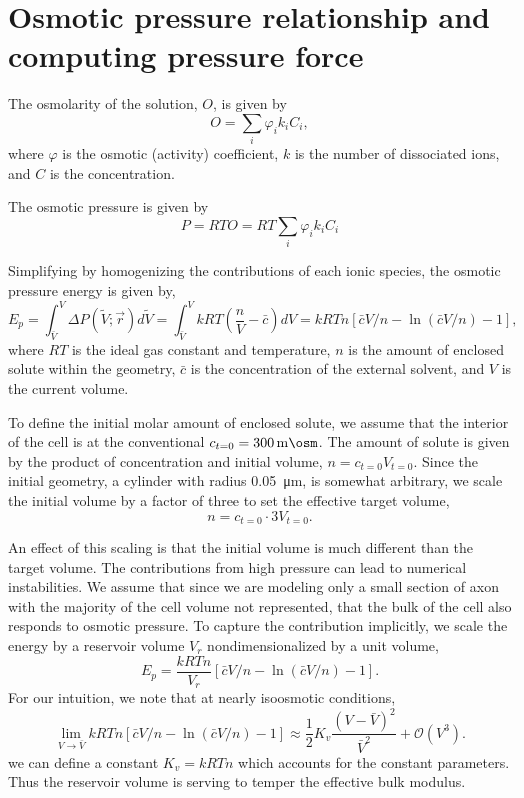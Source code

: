 \documentclass[11pt]{article}
\begin{document}
\section{Osmotic pressure relationship and computing pressure force}

The osmolarity of the solution, \(O\), is given by
\begin{equation}
    O = \sum_i \varphi_i k_i C_i,
\end{equation}
where \(\varphi\) is the osmotic (activity) coefficient, \(k\) is the number of dissociated ions, and \(C\) is the concentration.

The osmotic pressure is given by
\begin{equation}
    P = RTO  = RT \sum_i  \varphi_i k_i C_i
\end{equation}

Simplifying by homogenizing the contributions of each ionic species, the osmotic pressure energy is given by,
\begin{equation}
    E_p = \int_{\bar{V}}^{V} \Delta P(\tilde{V}; \vec{r})d \tilde{V} = \int_{\bar{V}}^{V} kRT \left(\frac{n}{V} - \bar{c}\right) dV = kRTn[\bar{c}V/n - \ln(\bar{c}V/n) -1],
\end{equation}
where \(RT\) is the ideal gas constant and temperature, \(n\) is the amount of enclosed solute within the geometry, \(\bar{c}\) is the concentration of the external solvent, and \(V\) is the current volume.

To define the initial molar amount of enclosed solute, we assume that the interior of the cell is at the conventional \(c_{t=0} = \SI{300}{\milli\osm}\).
The amount of solute is given by the product of concentration and initial volume, \(n = c_{t=0}V_{t=0}\). 
Since the initial geometry, a cylinder with radius \SI{0.05}{\micro\meter}, is somewhat arbitrary, we scale the initial volume by a factor of three to set the effective target volume,
\begin{equation}
    n = c_{t=0}\cdot3V_{t=0}.
\end{equation}

An effect of this scaling is that the initial volume is much different than the target volume. 
The contributions from high pressure can lead to numerical instabilities. 
We assume that since we are modeling only a small section of axon with the majority of the cell volume not represented, that the bulk of the cell also responds to osmotic pressure.
To capture the contribution implicitly, we scale the energy by a reservoir volume \(V_r\) nondimensionalized by a unit volume,
\begin{equation}
    E_p =\frac{kRTn}{V_r}[\bar{c}V/n - \ln(\bar{c}V/n) -1].
\end{equation}
For our intuition, we note that at nearly isoosmotic conditions,
\begin{equation}
    \lim_{V\to\bar{V}} kRTn[\bar{c}V/n - \ln(\bar{c}V/n) -1] \approx \frac{1}{2}K_v \frac{(V - \bar{V})^2}{\bar{V}^2} + \mathcal{O}(V^3).
\end{equation}
we can define a constant \(K_v = kRTn\) which accounts for the constant parameters.
Thus the reservoir volume is serving to temper the effective bulk modulus.


\printbibliography
\end{document}
